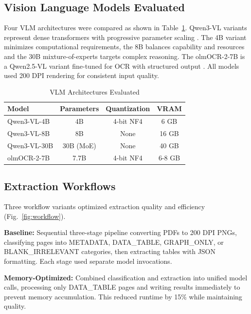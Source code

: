 \documentclass[conference]{IEEEtran}
\begin{document}
\subsection{Vision Language Models Evaluated}

Four VLM architectures were compared as shown in Table~\ref{tab:models}. Qwen3-VL variants represent dense transformers with progressive parameter scaling \cite{wen2023}. The 4B variant minimizes computational requirements, the 8B balances capability and resources and the 30B mixture-of-experts targets complex reasoning. The olmOCR-2-7B is a Qwen2.5-VL variant fine-tuned for OCR with structured output \cite{e2e2025}. All models used 200 DPI rendering for consistent input quality.

\begin{table}[htbp]
\caption{VLM Architectures Evaluated}
\label{tab:models}
\begin{center}
\begin{tabular}{lccc}
\toprule
\textbf{Model} & \textbf{Parameters} & \textbf{Quantization} & \textbf{VRAM} \\
\midrule
Qwen3-VL-4B & 4B & 4-bit NF4 & 6 GB \\
Qwen3-VL-8B & 8B & None & 16 GB \\
Qwen3-VL-30B & 30B (MoE) & None & 40 GB \\
olmOCR-2-7B & 7.7B & 4-bit NF4 & 6-8 GB \\
\bottomrule
\end{tabular}
\end{center}
\end{table}

\subsection{Extraction Workflows}

Three workflow variants optimized extraction quality and efficiency (Fig.~\ref{fig:workflow}).

\textbf{Baseline:} Sequential three-stage pipeline converting PDFs to 200 DPI PNGs, classifying pages into METADATA, DATA\_TABLE, GRAPH\_ONLY, or BLANK\_IRRELEVANT categories, then extracting tables with JSON formatting. Each stage used separate model invocations.

\textbf{Memory-Optimized:} Combined classification and extraction into unified model calls, processing only DATA\_TABLE pages and writing results immediately to prevent memory accumulation. This reduced runtime by 15\% while maintaining quality.
\end{document}
